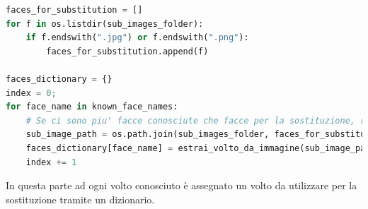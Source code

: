 \documentclass{report}
\begin{document}
\begin{lstlisting}[language=Python, breaklines=true, frame=single]
faces_for_substitution = []
for f in os.listdir(sub_images_folder):
    if f.endswith(".jpg") or f.endswith(".png"):
        faces_for_substitution.append(f)

faces_dictionary = {}
index = 0;
for face_name in known_face_names:
    # Se ci sono piu' facce conosciute che facce per la sostituzione, riutilizza le immagini partendo da 0
    sub_image_path = os.path.join(sub_images_folder, faces_for_substitution[index % len(faces_for_substitution)])
    faces_dictionary[face_name] = estrai_volto_da_immagine(sub_image_path)
    index += 1
\end{lstlisting}
In questa parte ad ogni volto conosciuto è assegnato un volto da utilizzare per la sostituzione tramite un dizionario.
\end{document}
